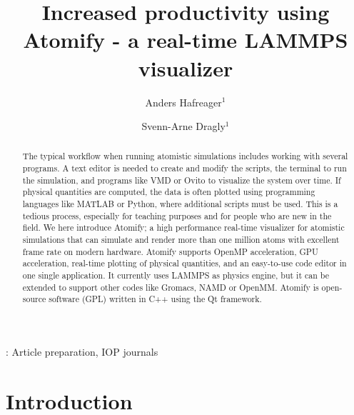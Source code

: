 \documentclass[12pt,a4paper,final]{iopart}
\begin{document}
\title{Increased productivity using Atomify - a real-time LAMMPS visualizer}

\author[cor1]{Anders Hafreager$^{1}$}
\address{$^1$Department of Physics - University of Oslo\\Sem S{\ae}lands vei 24, NO-0316, Oslo, Norway}

\author{Svenn-Arne Dragly$^{1}$}

\begin{abstract}
The typical workflow when running atomistic simulations includes working with several programs.
A text editor is needed to create and modify the scripts, the terminal to run the simulation, and programs like VMD or Ovito to visualize the system over time.
If physical quantities are computed, the data is often plotted using programming languages like MATLAB or Python,
where additional scripts must be used.
This is a tedious process, especially for teaching purposes and for people who are new in the field.
We here introduce Atomify; a high performance real-time visualizer for atomistic simulations that can simulate and render more than one million atoms with excellent frame rate on modern hardware.
Atomify supports OpenMP acceleration, GPU acceleration, real-time plotting of physical quantities, and an easy-to-use code editor in one single application.
It currently uses LAMMPS as physics engine, but it can be extended to support other codes like Gromacs, NAMD or OpenMM.
Atomify is open-source software (GPL) written in C++ using the Qt framework.
\end{abstract}

\vspace{2pc}
: Article preparation, IOP journals
\submitto{\JPA}

\section{Introduction}
\end{document}
